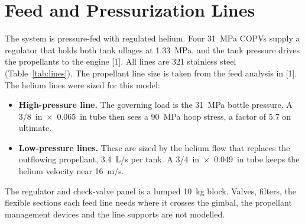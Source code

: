 \documentclass[10pt]{article}
\begin{document}
\section{Feed and Pressurization Lines}\label{sec:lines}
The system is pressure-fed with regulated helium. Four 31~MPa COPVs supply a regulator that holds both tank ullages at
1.33~MPa, and the tank pressure drives the propellants to the engine [1]. All lines are 321 stainless steel
(Table~\ref{tab:lines}). The propellant line size is taken from the feed analysis in [1]. The helium lines were sized
for this model:
\begin{itemize}
\item \textbf{High-pressure line.} The governing load is the 31~MPa bottle pressure. A 3/8~in~$\times$~0.065~in tube
then sees a 90~MPa hoop stress, a factor of 5.7 on ultimate.
\item \textbf{Low-pressure lines.} These are sized by the helium flow that replaces the outflowing propellant, 3.4~L/s
per tank. A 3/4~in~$\times$~0.049~in tube keeps the helium velocity near 16~m/s.
\end{itemize}

The regulator and check-valve panel is a lumped 10~kg block. Valves, filters, the flexible sections each feed line needs
where it crosses the gimbal, the propellant management devices and the line supports are not modelled.

\begin{table}[H]\centering\small\caption{Feed and pressurization lines.}\label{tab:lines}
\end{table}
\end{document}
